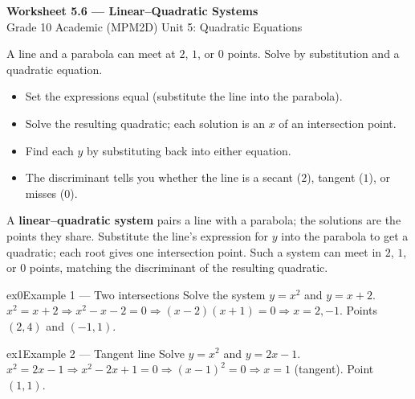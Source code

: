 \documentclass[11pt]{article}
\begin{document}
\begin{center}
{\LARGE\bfseries\color{titleblue}Worksheet 5.6 --- Linear--Quadratic Systems}\\[2pt]
{\small Grade 10 Academic (MPM2D) \textperiodcentered{} Unit 5: Quadratic Equations}
\end{center}

\begin{ideabox}
A line and a parabola can meet at $2$, $1$, or $0$ points. Solve by substitution and a quadratic equation.
\begin{itemize}[leftmargin=*,itemsep=2pt]
  \item Set the expressions equal (substitute the line into the parabola).
  \item Solve the resulting quadratic; each solution is an $x$ of an intersection point.
  \item Find each $y$ by substituting back into either equation.
  \item The discriminant tells you whether the line is a secant ($2$), tangent ($1$), or misses ($0$).
\end{itemize}
\end{ideabox}

\begin{learnbox}
A \textbf{linear--quadratic system} pairs a line with a parabola; the solutions are the points they share.
Substitute the line's expression for $y$ into the parabola to get a quadratic; each root gives one intersection point.
Such a system can meet in $2$, $1$, or $0$ points, matching the discriminant of the resulting quadratic.
\end{learnbox}


\begin{example}{ex0}{Example 1 --- Two intersections}
Solve the system $y=x^2$ and $y=x+2$.
\soln $x^2=x+2\Rightarrow x^2-x-2=0\Rightarrow (x-2)(x+1)=0\Rightarrow x=2,-1$. Points $(2,4)$ and $(-1,1)$.
\end{example}

\begin{example}{ex1}{Example 2 --- Tangent line}
Solve $y=x^2$ and $y=2x-1$.
\soln $x^2=2x-1\Rightarrow x^2-2x+1=0\Rightarrow (x-1)^2=0\Rightarrow x=1$ (tangent). Point $(1,1)$.
\end{example}
\end{document}
